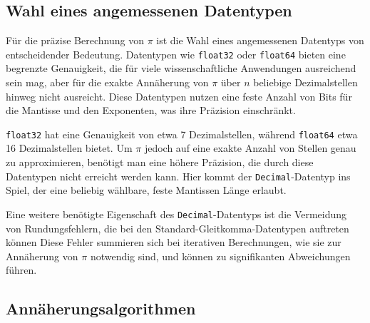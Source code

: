 \documentclass{scrartcl}
\theoremstyle{definition}
\newtheorem{approximation sequence}{Annäherungsfolge}
\begin{document}
\subsection{Wahl eines angemessenen Datentypen}

Für die präzise Berechnung von \(\pi\) ist die Wahl eines angemessenen
Datentyps von entscheidender Bedeutung. Datentypen wie \texttt{float32} oder
\texttt{float64} bieten eine begrenzte Genauigkeit, die für viele
wissenschaftliche Anwendungen ausreichend sein mag, aber für die exakte
Annäherung von \(\pi\) über \(n\) beliebige Dezimalstellen hinweg nicht
ausreicht.
Diese Datentypen nutzen eine feste Anzahl von Bits für die Mantisse und den
Exponenten, was ihre Präzision einschränkt.

\texttt{float32} hat eine Genauigkeit von etwa 7 Dezimalstellen, während
\texttt{float64} etwa 16 Dezimalstellen bietet.
Um \(\pi\) jedoch auf eine exakte Anzahl von Stellen genau zu approximieren,
benötigt man eine höhere Präzision, die durch diese Datentypen nicht erreicht
werden kann.
Hier kommt der \texttt{Decimal}-Datentyp ins Spiel, der eine beliebig wählbare,
feste Mantissen Länge erlaubt.

Eine weitere benötigte Eigenschaft des \texttt{Decimal}-Datentyps ist die
Vermeidung von Rundungsfehlern, die bei den Standard-Gleitkomma-Datentypen
auftreten können Diese Fehler summieren sich bei iterativen Berechnungen, wie
sie zur Annäherung von \(\pi\) notwendig sind, und können zu signifikanten
Abweichungen führen.

\subsection{Annäherungsalgorithmen}
\end{document}
